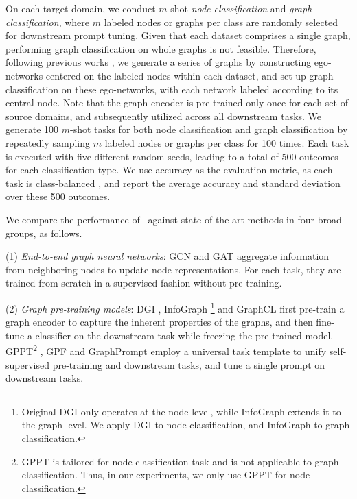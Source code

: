 On each target domain, we conduct $m$-shot \textit{node classification} and \textit{graph classification}, where $m$ labeled nodes or graphs per class are randomly selected for downstream prompt tuning. Given that each dataset comprises a single graph, performing graph classification on whole graphs is not feasible. Therefore, following previous works \cite{lu2021learning,yu2023hgprompt,yu2024non}, we generate a series of graphs by constructing ego-networks centered on the labeled nodes within each dataset, and set up graph classification on these ego-networks, with each network labeled according to its central node.
 Note that the graph encoder is pre-trained only once for each set of source domains, and subsequently utilized across all downstream tasks.
We generate 100 $m$-shot tasks for both node classification and graph classification by repeatedly sampling $m$ labeled nodes or graphs per class for 100 times. Each task is executed with five different random seeds, leading to a total of 500 outcomes for each classification type. 
We use accuracy as the evaluation metric, as each task is class-balanced \cite{wang2020graph,liu2021relative,liu2023graphprompt,yu2023generalized}, and report the average accuracy and standard deviation over these 500 outcomes.

We compare the performance of \model\ against state-of-the-art methods in four broad groups, as follows.

(1) \emph{End-to-end graph neural networks}: GCN \cite{kipf2016semi} and GAT \cite{velivckovic2017graph} aggregate information from neighboring nodes to update node representations. For each task, they are trained from scratch in a supervised fashion without pre-training.

(2) \emph{Graph pre-training models}: DGI \cite{velivckovic2018deep}, InfoGraph \cite{sun2019infograph}\footnote{Original DGI only operates at the node level, while InfoGraph extends it to the graph level. We apply DGI to node classification, and InfoGraph to graph classification.} and GraphCL \cite{you2020graph} first pre-train a graph encoder to capture the inherent properties of the graphs, and then fine-tune a classifier on the downstream task while freezing the pre-trained model.  GPPT\footnote{GPPT is tailored for node classification task and is not applicable to graph classification. Thus, in our experiments, we only use GPPT for node classification.} \cite{sun2022gppt}, GPF \cite{fang2022universal} and GraphPrompt \cite{liu2023graphprompt}  employ a universal task template to unify self-supervised pre-training and downstream tasks, and tune a single prompt on downstream tasks. 

